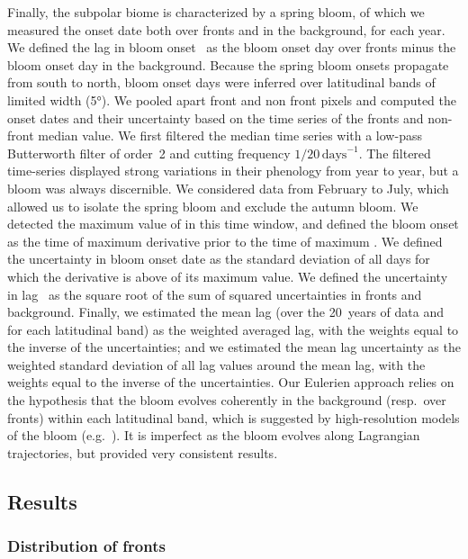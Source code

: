 Finally, the subpolar biome is characterized by a spring bloom, of which we measured the onset date both over fronts and in the background, for each year.
We defined the lag in bloom onset~ as the bloom onset day over fronts minus the bloom onset day in the background.
Because the spring bloom onsets propagate from south to north, bloom onset days were inferred over latitudinal bands of limited width (\ang{5}).
We pooled apart front and non front pixels and computed the onset dates and their uncertainty based on the time series of the fronts and non-front  median value.
We first filtered the  median time series with a low-pass Butterworth filter of order~2 and cutting frequency \(1/20\,\text{days}^{-1}\).
The filtered time-series displayed strong variations in their phenology from year to year, but a bloom was always discernible.
We considered data from February to July, which allowed us to isolate the spring bloom and exclude the autumn bloom.
We detected the maximum value of  in this time window, and defined the bloom onset as the time of maximum  derivative prior to the time of maximum .
We defined the uncertainty in bloom onset date as the standard deviation of all days for which the  derivative is above  of its maximum value.
We defined the uncertainty in lag~ as the square root of the sum of squared uncertainties in fronts and background.
Finally, we estimated the mean lag (over the 20~years of data and for each latitudinal band) as the weighted averaged lag, with the weights equal to the inverse of the uncertainties; and we estimated the mean lag uncertainty as the weighted standard deviation of all lag values around the mean lag, with the weights equal to the inverse of the uncertainties.
Our Eulerien approach relies on the hypothesis that the bloom evolves coherently in the background (resp.\ over fronts) within each latitudinal band, which is suggested by high-resolution models of the bloom (e.g.\ \cite{levy_2005a,karleskind_2011}).
It is imperfect as the bloom evolves along Lagrangian trajectories, but provided very consistent results.


\subsection{Results}

\subsubsection{Distribution of fronts}

